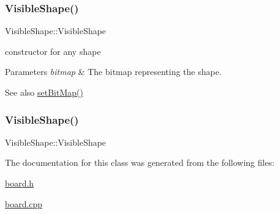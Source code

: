 \subsubsection{\texorpdfstring{Visible\+Shape()}{VisibleShape()}\hspace{0.1cm}{\footnotesize\ttfamily [2/3]}}
{\footnotesize\ttfamily Visible\+Shape\+::\+Visible\+Shape}



constructor for any shape 


\begin{DoxyParams}{Parameters}
{\em bitmap} & The bitmap representing the shape. \\
\hline
\end{DoxyParams}
\begin{DoxySeeAlso}{See also}
\mbox{\hyperlink{class_shape_ae79ee483d0f48a426d1a544fd22fd8e5}{set\+Bit\+Map()}} 
\end{DoxySeeAlso}
\mbox{\label{class_board_a280deeca2a39d227887ff2e13b009c0a}} 
\subsubsection{\texorpdfstring{Visible\+Shape()}{VisibleShape()}\hspace{0.1cm}{\footnotesize\ttfamily [3/3]}}
{\footnotesize\ttfamily Visible\+Shape\+::\+Visible\+Shape}



The documentation for this class was generated from the following files\+:\begin{DoxyCompactItemize}
\item 
\mbox{\hyperlink{board_8h}{board.\+h}}\item 
\mbox{\hyperlink{board_8cpp}{board.\+cpp}}\end{DoxyCompactItemize}
